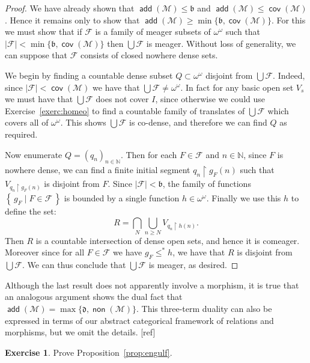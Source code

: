 \documentclass[11pt,oneside]{amsbook}
\newcommand{\set}[1]{\left\{\,#1\,\right\}}
\newcommand{\N}{\mathbb N}
\newcommand{\Meager}{\mathcal M}
\DeclareMathOperator{\add}{\mathsf{add}}
\DeclareMathOperator{\non}{\mathsf{non}}
\DeclareMathOperator{\cov}{\mathsf{cov}}
\theoremstyle{definition}
\newtheorem{exercise}{Exercise}[section]
\theoremstyle{plain}
\theoremstyle{definition}
\theoremstyle{remark}
\numberwithin{equation}{section}
\numberwithin{figure}{section}
\begin{document}
\begin{proof}
  We have already shown that $\add(\Meager)\leq\mathfrak b$ and $\add(\Meager)\leq\cov(\Meager)$. Hence it remains only to show that $\add(\Meager)\geq\min\{\mathfrak b,\cov(\Meager)\}$. For this we must show that if $\mathcal F$ is a family of meager subsets of $\omega^\omega$ such that $|\mathcal F|<\min\{\mathfrak b,\cov(\Meager)\}$ then $\bigcup\mathcal F$ is meager. Without loss of generality, we can suppose that $\mathcal F$ consists of closed nowhere dense sets.

  We begin by finding a countable dense subset $Q\subset\omega^\omega$ disjoint from $\bigcup\mathcal F$. Indeed, since $|\mathcal F|<\cov(\Meager)$ we have that $\bigcup\mathcal F\neq\omega^\omega$. In fact for any basic open set $V_s$ we must have that $\bigcup\mathcal F$ does not cover $I$, since otherwise we could use Exercise~\ref{exerc:homeo} to find a countable family of translates of $\bigcup\mathcal F$ which covers all of $\omega^\omega$. This shows $\bigcup\mathcal F$ is co-dense, and therefore we can find $Q$ as required.

  Now enumerate $Q=(q_n)_{n\in\N}$. Then for each $F\in\mathcal F$ and $n\in\N$, since $F$ is nowhere dense, we can find a finite initial segment $q_n\restriction g_F(n)$ such that $V_{q_n\restriction g_F(n)}$ is disjoint from $F$. Since $|\mathcal F|<\mathfrak b$, the family of functions $\set{g_F\mid F\in\mathcal F}$ is bounded by a single function $h\in\omega^\omega$. Finally we use this $h$ to define the set:
  \[R=\bigcap_N\bigcup_{n\geq N}V_{q_n\restriction h(n)}\text{.}
  \]
  Then $R$ is a countable intersection of dense open sets, and hence it is comeager. Moreover since for all $F\in\mathcal F$ we have $g_F\leq^*h$, we have that $R$ is disjoint from $\bigcup\mathcal F$. We can thus conclude that $\bigcup\mathcal F$ is meager, as desired.
\end{proof}

Although the last result does not apparently involve a morphism, it is true that an analogous argument shows the dual fact that $\add(\Meager)=\max\{\mathfrak d,\non(\Meager)\}$. This three-term duality can also be expressed in terms of our abstract categorical framework of relations and morphisms, but we omit the details. [ref]

\begin{exercise}
  \label{exerc:engulf}
  Prove Proposition~\ref{prop:engulf}.
\end{exercise}
\end{document}
